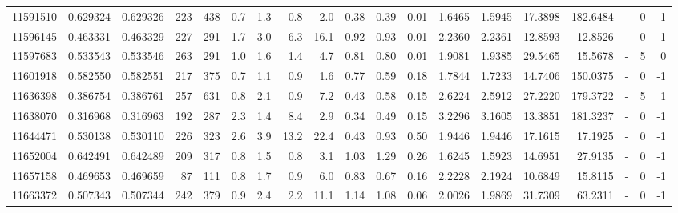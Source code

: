 \begin{tabular}{rrrrrrrrrrrrrrrrlrr}
  11591510 & 0.629324 &   0.629326 &  223 &  438 &      0.7 &      1.3 &     0.8 &      2.0 &       0.38 &        0.39 &        0.01 &  1.6465 &  1.5945 &   17.3898 &  182.6484 &             - &        0 &         -1 \\
  11596145 & 0.463331 &   0.463329 &  227 &  291 &      1.7 &      3.0 &     6.3 &     16.1 &       0.92 &        0.93 &        0.01 &  2.2360 &  2.2361 &   12.8593 &   12.8526 &             - &        0 &         -1 \\
  11597683 & 0.533543 &   0.533546 &  263 &  291 &      1.0 &      1.6 &     1.4 &      4.7 &       0.81 &        0.80 &        0.01 &  1.9081 &  1.9385 &   29.5465 &   15.5678 &             - &        5 &          0 \\
  11601918 & 0.582550 &   0.582551 &  217 &  375 &      0.7 &      1.1 &     0.9 &      1.6 &       0.77 &        0.59 &        0.18 &  1.7844 &  1.7233 &   14.7406 &  150.0375 &             - &        0 &         -1 \\
  11636398 & 0.386754 &   0.386761 &  257 &  631 &      0.8 &      2.1 &     0.9 &      7.2 &       0.43 &        0.58 &        0.15 &  2.6224 &  2.5912 &   27.2220 &  179.3722 &             - &        5 &          1 \\
  11638070 & 0.316968 &   0.316963 &  192 &  287 &      2.3 &      1.4 &     8.4 &      2.9 &       0.34 &        0.49 &        0.15 &  3.2296 &  3.1605 &   13.3851 &  181.3237 &             - &        0 &         -1 \\
  11644471 & 0.530138 &   0.530110 &  226 &  323 &      2.6 &      3.9 &    13.2 &     22.4 &       0.43 &        0.93 &        0.50 &  1.9446 &  1.9446 &   17.1615 &   17.1925 &             - &        0 &         -1 \\
  11652004 & 0.642491 &   0.642489 &  209 &  317 &      0.8 &      1.5 &     0.8 &      3.1 &       1.03 &        1.29 &        0.26 &  1.6245 &  1.5923 &   14.6951 &   27.9135 &             - &        0 &         -1 \\
  11657158 & 0.469653 &   0.469659 &   87 &  111 &      0.8 &      1.7 &     0.9 &      6.0 &       0.83 &        0.67 &        0.16 &  2.2228 &  2.1924 &   10.6849 &   15.8115 &             - &        0 &         -1 \\
  11663372 & 0.507343 &   0.507344 &  242 &  379 &      0.9 &      2.4 &     2.2 &     11.1 &       1.14 &        1.08 &        0.06 &  2.0026 &  1.9869 &   31.7309 &   63.2311 &             - &        0 &         -1 \\

\end{tabular}
